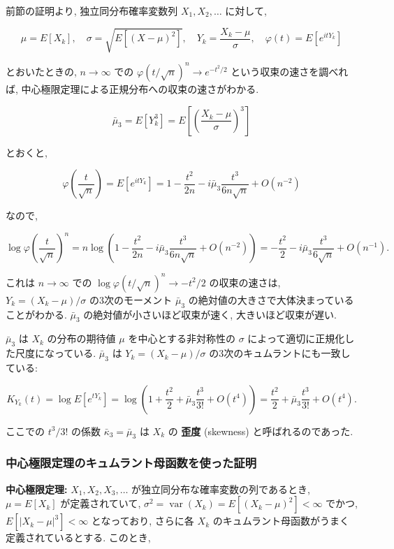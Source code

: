 \documentclass[10pt, a4paper,xelatex,ja=standard]{bxjsarticle}
\newcommand\op{\operatorname}
\newcommand\var{\op{var}}
\begin{document}
前節の証明より, 独立同分布確率変数列 \(X_1,X_2,\ldots\) に対して,

\[
\mu = E[X_k], \quad
\sigma = \sqrt{E[(X-\mu)^2]}, \quad
Y_k = \frac{X_k - \mu}{\sigma}, \quad
\varphi(t) = E[e^{itY_k}]
\]

とおいたときの, \(n\to\infty\) での
\(\varphi(t/\sqrt{n})^n \to e^{-t^2/2}\) という収束の速さを調べれば,
中心極限定理による正規分布への収束の速さがわかる.

\[
\bar\mu_3 = E[Y_k^3] = E\left[\left(\frac{X_k - \mu}{\sigma}\right)^3\right]
\]

とおくと,

\[
\varphi\left(\frac{t}{\sqrt{n}}\right) = E[e^{itY_k}] =
1 - \frac{t^2}{2n} - i\bar\mu_3\frac{t^3}{6n\sqrt{n}} + O(n^{-2})
\]

なので,

\[
\log\varphi\left(\frac{t}{\sqrt{n}}\right)^n = 
n\log\left(1 - \frac{t^2}{2n} - i\bar\mu_3\frac{t^3}{6n\sqrt{n}} + O(n^{-2})\right) =
-\frac{t^2}{2} - i\bar\mu_3\frac{t^3}{6\sqrt{n}} + O(n^{-1}).
\]

これは \(n\to\infty\) での
\(\log\varphi\left(t/\sqrt{n}\right)^n \to -t^2/2\) の収束の速さは,
\(Y_k=(X_k-\mu)/\sigma\) の3次のモーメント \(\bar\mu_3\)
の絶対値の大きさで大体決まっていることがわかる. \(\bar\mu_3\)
の絶対値が小さいほど収束が速く, 大きいほど収束が遅い.

\(\bar\mu_3\) は \(X_k\) の分布の期待値 \(\mu\) を中心とする非対称性の
\(\sigma\) によって適切に正規化した尺度になっている. \(\bar\mu_3\) は
\(Y_k=(X_k-\mu)/\sigma\) の3次のキュムラントにも一致している:

\[
K_{Y_k}(t) = \log E[e^{tY_k}] =
\log\left(1 + \frac{t^2}{2} + \bar\mu_3\frac{t^3}{3!} + O(t^4)\right) =
\frac{t^2}{2} + \bar\mu_3 \frac{t^3}{3!} + O(t^4).
\]

ここでの \(t^3/3!\) の係数 \(\bar\kappa_3 = \bar\mu_3\) は \(X_k\) の
\textbf{歪度} (skewness) と呼ばれるのであった.

    \hypertarget{ux4e2dux5fc3ux6975ux9650ux5b9aux7406ux306eux30adux30e5ux30e0ux30e9ux30f3ux30c8ux6bcdux51fdux6570ux3092ux4f7fux3063ux305fux8a3cux660e}{%
\subsubsection{中心極限定理のキュムラント母函数を使った証明}\label{ux4e2dux5fc3ux6975ux9650ux5b9aux7406ux306eux30adux30e5ux30e0ux30e9ux30f3ux30c8ux6bcdux51fdux6570ux3092ux4f7fux3063ux305fux8a3cux660e}}

\textbf{中心極限定理:} \(X_1, X_2, X_3, \ldots\)
が独立同分布な確率変数の列であるとき, \(\mu=E[X_k]\) が定義されていて,
\(\sigma^2 = \var(X_k) = E[(X_k - \mu)^2] < \infty\) でかつ,
\(E[|X_k - \mu|^3] < \infty\) となっており, さらに各 \(X_k\)
のキュムラント母函数がうまく定義されているとする. このとき,
\end{document}
